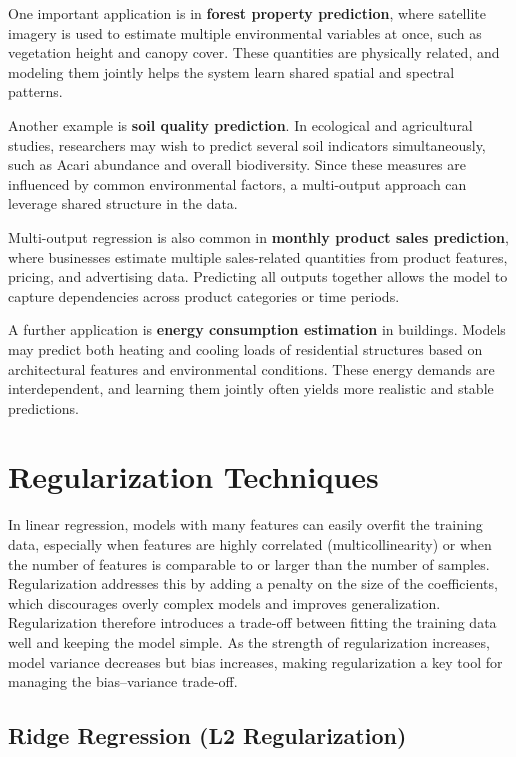\documentclass{article}
\begin{document}
One important application is in \textbf{forest property prediction}, where satellite imagery is used to estimate multiple environmental variables at once, such as vegetation height and canopy cover. These quantities are physically related, and modeling them jointly helps the system learn shared spatial and spectral patterns.

Another example is \textbf{soil quality prediction}. In ecological and agricultural studies, researchers may wish to predict several soil indicators simultaneously, such as Acari abundance and overall biodiversity. Since these measures are influenced by common environmental factors, a multi-output approach can leverage shared structure in the data.

Multi-output regression is also common in \textbf{monthly product sales prediction}, where businesses estimate multiple sales-related quantities from product features, pricing, and advertising data. Predicting all outputs together allows the model to capture dependencies across product categories or time periods.

A further application is \textbf{energy consumption estimation} in buildings. Models may predict both heating and cooling loads of residential structures based on architectural features and environmental conditions. These energy demands are interdependent, and learning them jointly often yields more realistic and stable predictions.

\section{Regularization Techniques}

In linear regression, models with many features can easily overfit the training data, especially when features are highly correlated (multicollinearity) or when the number of features is comparable to or larger than the number of samples. Regularization addresses this by adding a penalty on the size of the coefficients, which discourages overly complex models and improves generalization. Regularization therefore introduces a trade-off between fitting the training data well and keeping the model simple. As the strength of regularization increases, model variance decreases but bias increases, making regularization a key tool for managing the bias--variance trade-off.

\subsection{Ridge Regression (L2 Regularization)}
\end{document}
